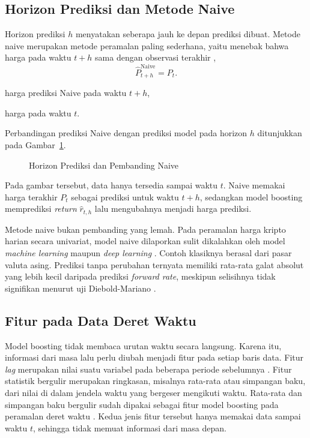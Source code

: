 \subsection{Horizon Prediksi dan Metode Naive}
\label{subsec:naive}
Horizon prediksi $h$ menyatakan seberapa jauh ke depan prediksi dibuat. Metode
naive
merupakan metode peramalan paling sederhana, yaitu menebak bahwa harga pada
waktu $t+h$ sama dengan observasi terakhir \cite{hyndman2006},
\begin{equation}
  \hat{P}_{t+h}^{\text{Naive}} = P_t .
  \label{eq:naive}
\end{equation}
\begin{keterangan}
  \item[$\hat{P}_{t+h}^{\text{Naive}}$] harga prediksi Naive pada
    waktu $t+h$,
  \item[$P_t$] harga pada waktu $t$.
\end{keterangan}
Perbandingan prediksi Naive dengan prediksi model pada horizon $h$ ditunjukkan pada Gambar~\ref{fig:horizon-naive}.

\begin{figure}[!htbp]
  \centering
  \caption{Horizon Prediksi dan Pembanding Naive}
  \label{fig:horizon-naive}
\end{figure}
Pada gambar tersebut, data hanya tersedia sampai waktu $t$.
Naive memakai harga terakhir $P_t$ sebagai prediksi untuk waktu $t+h$,
sedangkan model boosting memprediksi \textit{return} $\hat{r}_{t,h}$ lalu
mengubahnya menjadi harga prediksi.

Metode naive bukan pembanding yang lemah. Pada peramalan harga kripto
harian secara univariat, model naive dilaporkan sulit dikalahkan oleh model
\textit{machine learning} maupun \textit{deep learning} \cite{puoti2024}.
Contoh klasiknya berasal dari pasar valuta asing. Prediksi tanpa perubahan
ternyata memiliki rata-rata galat absolut yang lebih kecil daripada prediksi
\textit{forward rate}, meskipun selisihnya tidak signifikan menurut uji
Diebold-Mariano \cite{diebold1995}.

\subsection{Fitur pada Data Deret Waktu}
\label{subsec:teorifitur}
Model boosting tidak membaca urutan waktu secara langsung. Karena itu,
informasi dari masa lalu perlu diubah menjadi fitur pada setiap baris data.
Fitur \textit{lag} merupakan nilai suatu variabel pada beberapa periode sebelumnya \cite{hyndman2014fpp}. Fitur statistik bergulir merupakan ringkasan, misalnya rata-rata
atau simpangan baku, dari nilai di dalam jendela waktu yang bergeser
mengikuti waktu. Rata-rata dan simpangan baku bergulir sudah dipakai sebagai
fitur model boosting pada peramalan deret waktu \cite{nasios2022}. Kedua jenis fitur tersebut hanya memakai data sampai waktu
$t$, sehingga tidak memuat informasi dari masa depan.

